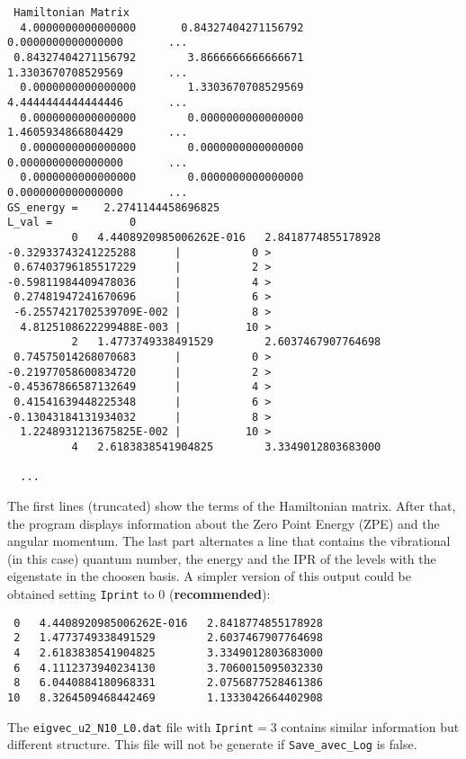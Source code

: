 \documentclass[a4paper,12pt,captions=tableheading]{article}
\begin{document}
\begin{verbatim}
 Hamiltonian Matrix
  4.0000000000000000       0.84327404271156792        0.0000000000000000       ...      
 0.84327404271156792        3.8666666666666671        1.3303670708529569       ...     
  0.0000000000000000        1.3303670708529569        4.4444444444444446       ...     
  0.0000000000000000        0.0000000000000000        1.4605934866804429       ...      
  0.0000000000000000        0.0000000000000000        0.0000000000000000       ...     
  0.0000000000000000        0.0000000000000000        0.0000000000000000       ...      
GS_energy =    2.2741144458696825     
L_val =            0
          0   4.4408920985006262E-016   2.8418774855178928     
-0.32933743241225288      |           0 >
 0.67403796185517229      |           2 >
-0.59811984409478036      |           4 >
 0.27481947241670696      |           6 >
 -6.2557421702539709E-002 |           8 >
  4.8125108622299488E-003 |          10 >
          2   1.4773749338491529        2.6037467907764698     
 0.74575014268070683      |           0 >
-0.21977058600834720      |           2 >
-0.45367866587132649      |           4 >
 0.41541639448225348      |           6 >
-0.13043184131934032      |           8 >
  1.2248931213675825E-002 |          10 >
          4   2.6183838541904825        3.3349012803683000     

  ...
\end{verbatim}

The first lines (truncated) show the terms of the Hamiltonian matrix. After that, the program displays information about the Zero Point Energy (ZPE) and the angular momentum. The last part alternates a line that contains the vibrational (in this case) quantum number, the energy and the IPR of the levels with the eigenstate in the choosen basis. A simpler version of this output could be obtained setting \verb~Iprint~ to \(0\) (\textbf{recommended}):

\begin{verbatim}
 0   4.4408920985006262E-016   2.8418774855178928     
 2   1.4773749338491529        2.6037467907764698     
 4   2.6183838541904825        3.3349012803683000     
 6   4.1112373940234130        3.7060015095032330     
 8   6.0440884180968331        2.0756877528461386     
10   8.3264509468442469        1.1333042664402908
\end{verbatim}

The \texttt{eigvec\_u2\_N10\_L0.dat} file with \verb~Iprint~\(=3\) contains similar information but different structure. This file will not be generate if \verb~Save_avec_Log~ is false.
\end{document}
